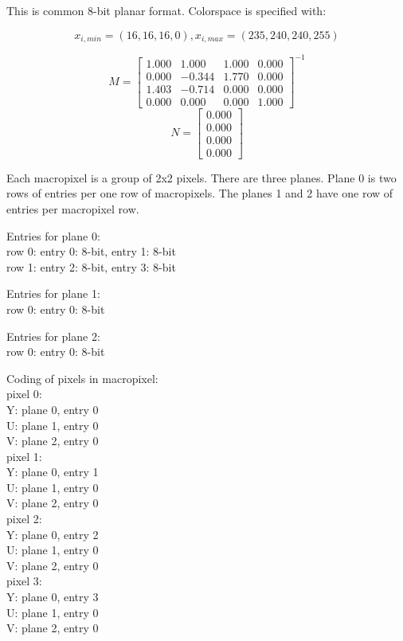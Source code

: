 This is common 8-bit planar format. Colorspace is specified with:

\begin{displaymath}
x_{i,min} = (16, 16, 16, 0),
x_{i,max} = (235, 240, 240, 255)
\end{displaymath}

\begin{displaymath}
M =
  \left[ \begin{array}{ rrrr }
    1.000 & 1.000 & 1.000 & 0.000 \\
    0.000 & -0.344 & 1.770 & 0.000 \\
    1.403 & -0.714 & 0.000 & 0.000 \\
    0.000 & 0.000 & 0.000 & 1.000
  \end{array} \right]^{-1}
\end{displaymath}
\begin{displaymath}
N =
  \left[ \begin{array}{ r }
    0.000 \\
    0.000 \\
    0.000 \\
    0.000
  \end{array} \right]
\end{displaymath}

Each macropixel is a group of 2x2 pixels. There are three planes. Plane 0 is two rows of entries per one row of macropixels. The planes 1 and 2 have one row of entries per macropixel row.

Entries for plane 0: \\
row 0: entry 0: 8-bit, entry 1: 8-bit \\
row 1: entry 2: 8-bit, entry 3: 8-bit

Entries for plane 1: \\
row 0: entry 0: 8-bit

Entries for plane 2: \\
row 0: entry 0: 8-bit

Coding of pixels in macropixel: \\
pixel 0: \\
Y: plane 0, entry 0 \\
U: plane 1, entry 0 \\
V: plane 2, entry 0 \\
pixel 1: \\
Y: plane 0, entry 1 \\
U: plane 1, entry 0 \\
V: plane 2, entry 0 \\
pixel 2: \\
Y: plane 0, entry 2 \\
U: plane 1, entry 0 \\
V: plane 2, entry 0 \\
pixel 3: \\
Y: plane 0, entry 3 \\
U: plane 1, entry 0 \\
V: plane 2, entry 0 \\

